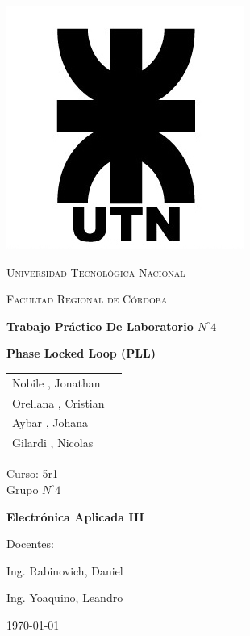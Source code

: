 \documentclass[twocolumn]{article}
\begin{document}
\begin{titlepage}
 \centering
	\includegraphics[scale=0.80]{imagenes/LOGO.jpg} \par
 	\vspace{1cm}
 	{\scshape\LARGE Universidad Tecnológica Nacional \par}
 	{\scshape\large Facultad Regional de Córdoba \par}
 	\vspace{1cm}
	{\bfseries \Large Trabajo Práctico De Laboratorio $N^{\circ} 4$\par}
	{\bfseries \Large Phase Locked Loop (PLL)\par}
 	\vspace{1.5cm}

	\begin{tabular}{ll}
		Nobile , Jonathan	  \\	
		Orellana , Cristian	  \\
		Aybar  , Johana		  \\
		Gilardi , Nicolas 
	\end{tabular}
	
	\vspace{1cm}
	Curso: 5r1 \\
	Grupo $N^{\circ} 4$
 	\vfill
	{\bfseries \Large Electrónica Aplicada III \par}

	\vspace{1.5cm}
	Docentes: \par
	Ing. Rabinovich, Daniel \par
	Ing. Yoaquino, Leandro \par

 	\vfill
	{\large \today\par}
\end{titlepage}
\end{document}
